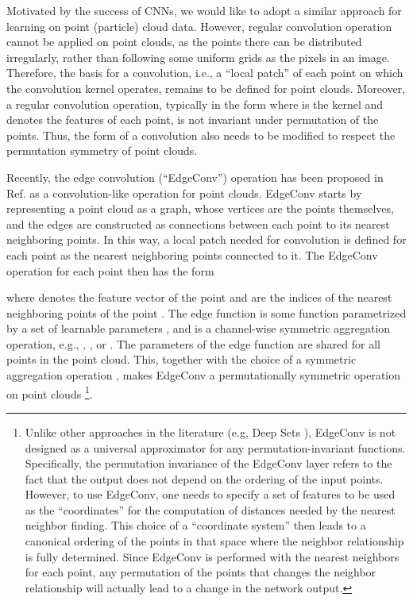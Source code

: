 \documentclass[aps,prd,longbibliography,reprint,amsmath,amssymb,amsfonts]{revtex4-1}
\begin{document}
Motivated by the success of CNNs, we would like to adopt a similar approach for learning on point (particle) cloud data. However, regular convolution operation cannot be applied on point clouds, as the points there can be distributed irregularly, rather than following some uniform grids as the pixels in an image. Therefore, the basis for a convolution, i.e., a ``local patch'' of each point on which the convolution kernel operates, remains to be defined for point clouds. Moreover, a regular convolution operation, typically in the form  where  is the kernel and  denotes the features of each point, is not invariant under permutation of the points. Thus, the form of a convolution also needs to be modified to respect the permutation symmetry of point clouds.

Recently, the edge convolution (``EdgeConv'') operation has been proposed in Ref. \cite{DBLP:journals/corr/abs-1801-07829} as a convolution-like operation for point clouds. EdgeConv starts by representing a point cloud as a graph, whose vertices are the points themselves, and the edges are constructed as connections between each point to its  nearest neighboring points. In this way, a local patch needed for convolution is defined for each point as the  nearest neighboring points connected to it. The EdgeConv operation for each point  then has the form

where  denotes the feature vector of the point  and  are the indices of the  nearest neighboring points of the point . The edge function  is some function parametrized by a set of learnable parameters , and  is a channel-wise symmetric aggregation operation, e.g., , , or . The parameters  of the edge function are shared for all points in the point cloud. This, together with the choice of a symmetric aggregation operation , makes EdgeConv a permutationally symmetric operation on point clouds \footnote{Unlike other approaches in the literature (e.g, Deep Sets \cite{zaheer2017deep}), EdgeConv is not designed as a universal approximator for any permutation-invariant functions. Specifically, the permutation invariance of the EdgeConv layer refers to the fact that the output does not depend on the ordering of the input points. However, to use EdgeConv, one needs to specify a set of features to be used as the ``coordinates'' for the computation of distances needed by the nearest neighbor finding. This choice of a ``coordinate system'' then leads to a canonical ordering of the points in that space where the neighbor relationship is fully determined. Since EdgeConv is performed with the  nearest neighbors for each point, any permutation of the points that changes the neighbor relationship will actually lead to a change in the network output.}.
\end{document}
